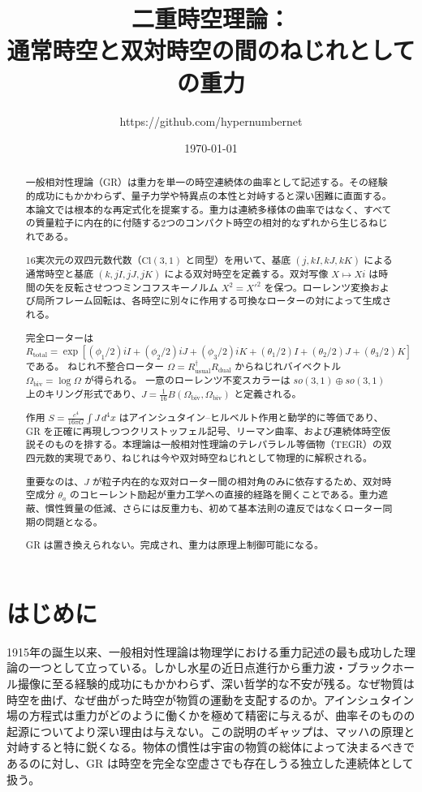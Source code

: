 \documentclass[a4paper]{article}
\title{二重時空理論：\\通常時空と双対時空の間のねじれとしての重力}
\author{https://github.com/hypernumbernet}
\date{\today}
\begin{document}
\maketitle

\begin{abstract}
一般相対性理論（GR）は重力を単一の時空連続体の曲率として記述する。その経験的成功にもかかわらず、量子力学や特異点の本性と対峙すると深い困難に直面する。本論文では根本的な再定式化を提案する。重力は連続多様体の曲率ではなく、すべての質量粒子に内在的に付随する2つのコンパクト時空の相対的なずれから生じるねじれである。

16実次元の双四元数代数（$\mathrm{Cl}(3,1)$ と同型）を用いて、基底 $(j, kI, kJ, kK)$ による通常時空と基底 $(k, jI, jJ, jK)$ による双対時空を定義する。双対写像 $X \mapsto Xi$ は時間の矢を反転させつつミンコフスキーノルム $X^2 = X'^2$ を保つ。ローレンツ変換および局所フレーム回転は、各時空に別々に作用する可換なローターの対によって生成される。

完全ローターは $R_\text{total} = \exp[(\phi_1/2)iI + (\phi_2/2)iJ + (\phi_3/2)iK + (\theta_1/2)I + (\theta_2/2)J + (\theta_3/2)K]$ である。
ねじれ不整合ローター $\Omega = R^\dagger_\text{usual} R_\text{dual}$ からねじれバイベクトル $\Omega_\text{biv} = \log \Omega$ が得られる。
一意のローレンツ不変スカラーは $so(3,1) \oplus so(3,1)$ 上のキリング形式であり、$J = \frac{1}{16} B(\Omega_\text{biv}, \Omega_\text{biv})$ と定義される。

作用 $S = \frac{c^4}{16\pi G} \int J \, d^4x$ はアインシュタイン--ヒルベルト作用と動学的に等価であり、GR を正確に再現しつつクリストッフェル記号、リーマン曲率、および連続体時空仮説そのものを排する。本理論は一般相対性理論のテレパラレル等価物（TEGR）の双四元数的実現であり、ねじれは今や双対時空ねじれとして物理的に解釈される。

重要なのは、$J$ が粒子内在的な双対ローター間の相対角のみに依存するため、双対時空成分 $\theta_a$ のコヒーレント励起が重力工学への直接的経路を開くことである。重力遮蔽、慣性質量の低減、さらには反重力も、初めて基本法則の違反ではなくローター同期の問題となる。

GR は置き換えられない。完成され、重力は原理上制御可能になる。
\end{abstract}

\section{はじめに}
\label{sec:introduction}

1915年の誕生以来、一般相対性理論は物理学における重力記述の最も成功した理論の一つとして立っている。しかし水星の近日点進行から重力波・ブラックホール撮像に至る経験的成功にもかかわらず、深い哲学的な不安が残る。なぜ物質は時空を曲げ、なぜ曲がった時空が物質の運動を支配するのか。アインシュタイン場の方程式は重力がどのように働くかを極めて精密に与えるが、曲率そのものの起源についてより深い理由は与えない。この説明のギャップは、マッハの原理と対峙すると特に鋭くなる。物体の慣性は宇宙の物質の総体によって決まるべきであるのに対し、GR は時空を完全な空虚さでも存在しうる独立した連続体として扱う。
\end{document}
